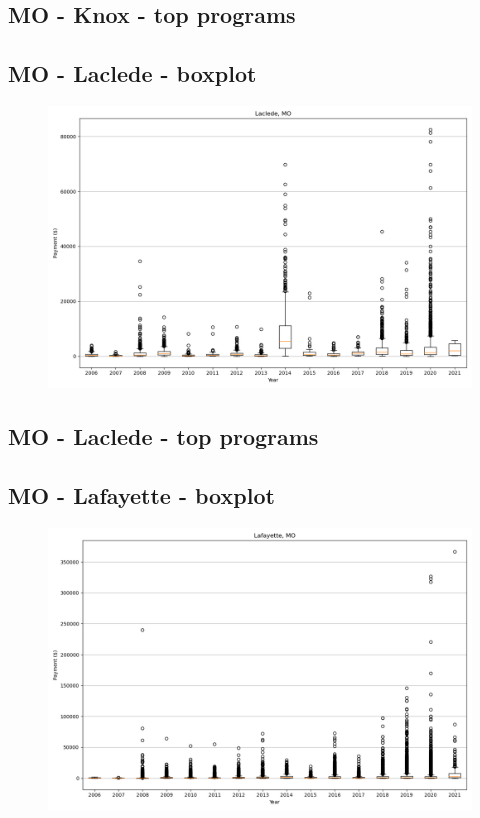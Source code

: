 \subsection*{MO - Knox - top programs}

\newpage
\subsection*{MO - Laclede - boxplot}
\begin{figure}[h]
\centering
\includegraphics[width=7in]{../output/boxplots/counties/Laclede-MO_boxplot.png}
\end{figure}


\subsection*{MO - Laclede - top programs}

\newpage
\subsection*{MO - Lafayette - boxplot}
\begin{figure}[h]
\centering
\includegraphics[width=7in]{../output/boxplots/counties/Lafayette-MO_boxplot.png}
\end{figure}


